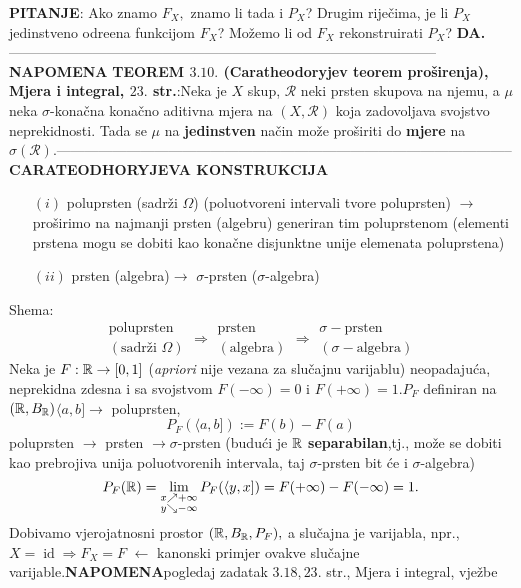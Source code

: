 \documentclass{article}
\newcommand{\id}{\operatorname{id}}
\begin{document}
\textbf{PITANJE}: Ako znamo \(F_X,\) znamo li tada i \(P_X\)? Drugim riječima, je li \(P_X\) jedinstveno odre\dj{}ena funkcijom \(F_X\)? Možemo li od \(F_X\) rekonstruirati \(P_X\)? \textbf{DA.}\newline\newline--------------------------------------------------------------------------------------------\newline\newline {}\textbf{NAPOMENA} \textbf{TEOREM \(3.10.\) (Caratheodoryjev teorem proširenja), Mjera i integral, \(23.\) str.}:\newline Neka je \(X\) skup, \(\mathcal R\) neki prsten skupova na njemu, a \(\mu\) neka \(\sigma\)-konačna konačno aditivna mjera na \((X,\mathcal R)\) koja zadovoljava svojstvo neprekidnosti. Tada se \(\mu\) na \textbf{jedinstven} način može proširiti do \textbf{mjere} na \(\sigma(\mathcal R).\)\newline\newline--------------------------------------------------------------------------------------------------\newline\newline
\textbf{CARATEODHORYJEVA KONSTRUKCIJA}
\begin{enumerate}
    \item[\((i)\)] poluprsten (sadrži \(\Omega\)) (poluotvoreni intervali tvore poluprsten) \(\to\) proširimo na najmanji prsten (algebru) generiran tim poluprstenom (elementi prstena mogu se dobiti kao konačne disjunktne unije elemenata poluprstena)
    \item[\((ii)\)] prsten (algebra)\(\to\) \(\sigma\)-prsten (\(\sigma\)-algebra)
\end{enumerate}
Shema: \[\substack{\text{poluprsten}\\(\text{sadrži }\Omega)}\Rightarrow\substack{\text{prsten}\\(\text{algebra})}\Rightarrow\substack{\sigma-\text{prsten}\\(\sigma-\text{algebra})}\]
Neka je \(F:\Bbb R\to [0,1]\) (\textit{apriori} nije vezana za slučajnu varijablu) neopadajuća, neprekidna zdesna i sa svojstvom \(F(-\infty)=0\) i \(F(+\infty)=1.\)\newline \(P_F\) definiran na \((\Bbb R, B_{\Bbb R})\)\newline \(\langle a,b]\to\) poluprsten, \[P_F(\langle a,b]):=F(b)-F(a)\] poluprsten \(\to\) prsten \(\to\sigma\)-prsten (budući je \(\Bbb R\) \textbf{separabilan},tj., može se dobiti kao prebrojiva unija poluotvorenih intervala, taj \(\sigma\)-prsten bit će i \(\sigma\)-algebra) \[P_F(\Bbb R)=\lim_{\substack{x\nearrow+\infty\\y\searrow-\infty}}P_F(\langle y,x])=F(+\infty)-F(-\infty)=1.\] Dobivamo vjerojatnosni prostor \((\Bbb R, B_{\Bbb R},P_F),\) a slučajna je varijabla, npr., \(X=\id\Rightarrow F_X=F\) \(\leftarrow\) kanonski primjer ovakve slučajne varijable.\newline {}\textbf{NAPOMENA}\newline pogledaj zadatak \(3.18,23.\) str., Mjera i integral, vježbe\newline\newline
\end{document}
